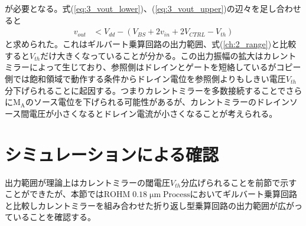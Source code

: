         が必要となる。式(\ref{eq:3_vout_lower})、(\ref{eq:3_vout_upper})の辺々を足し合わせると
        \begin{align}
            v_{out}&<V_{dd}-(V_{BS}+2v_{in}+2V_{CTRL}-V_{th})                  \label{eq:3_vout_range}
        \end{align}
        と求められた。これはギルバート乗算回路の出力範囲、式(\ref{ch:2_range})と比較すると$V_{th}$だけ大きくなっていることが分かる。この出力振幅の拡大はカレントミラーによって生じており、参照側はドレインとゲートを短絡しているがコピー側では飽和領域で動作する条件からドレイン電位を参照側よりもしきい電圧$V_{th}$分下げられることに起因する。つまりカレントミラーを多数接続することでさらに$\mathrm{M_{A}}$のソース電位を下げられる可能性があるが、カレントミラーのドレインソース間電圧が小さくなるとドレイン電流が小さくなることが考えられる。


    \section{シミュレーションによる確認}
        
        出力範囲が理論上はカレントミラーの閾電圧$V_{th}$分広げられることを前節で示すことができたが、本節では$\mathrm{ROHM\;0.18\;\mu m\;Process}$においてギルバート乗算回路と比較しカレントミラーを組み合わせた折り返し型乗算回路の出力範囲が広がっていることを確認する。

